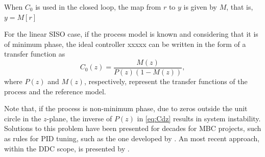 When $C_0$ is used in the closed loop, the map from $r$ to $y$ is given by $M$, that is, $y=M[r]$

For the linear SISO case, if the process model is known and considering that it is of
minimum phase, the ideal controller xxxxx can be written in the form of a transfer function as
\begin{equation}
   C_0(z) = \frac{M(z)}{P(z)\left(1-M(z)\right)},
   \label{eq:Cdz}
\end{equation}
where $P(z)$ and $M(z)$, respectively, represent the transfer functions of the process and the reference model.

Note that, if the process is non-minimum phase, due to zeros outside the unit circle in the $z$-plane, the inverse of $P(z)$ in \eqref{eq:Cdz} results in system instability. Solutions to this problem have been presented for decades for MBC projects, such as rules for PID tuning, such as the one developed by \cite{skogestad2003}.
An most recent approach, within the DDC scope, is presented by \cite{campestrini2011}.




